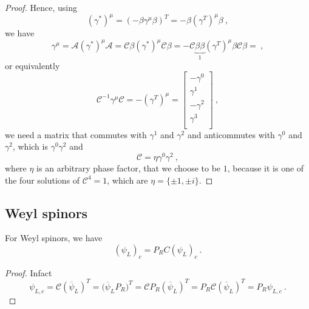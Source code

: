\begin{proof}
        Hence, using
        \begin{equation*}
            (\gamma^*)^\mu = (- \beta \gamma^\mu \beta)^T = - \beta (\gamma^T)^\mu \beta ~,
        \end{equation*}
        we have 
        \begin{equation*}
            \gamma^\mu = \mathcal A (\gamma^*)^\mu \mathcal A = \mathcal C \beta (\gamma^*)^\mu \mathcal C \beta = -\mathcal C \underbrace{\beta \beta }_ 1(\gamma^T)^\mu \beta \mathcal C \beta = ~,
        \end{equation*}
        or equivalently
        \begin{equation*}
            \mathcal C^{-1} \gamma^\mu \mathcal C = - (\gamma^T)^\mu = \begin{bmatrix}
                - \gamma^0 \\ \gamma^1 \\ - \gamma^2 \\ \gamma^3 \\
            \end{bmatrix} ~,
        \end{equation*}
        we need a matrix that commutes with $\gamma^1$ and $\gamma^2$ and anticommutes with $\gamma^0$ and $\gamma^2$, which is $\gamma^0 \gamma^2$ and 
        \begin{equation*}
            \mathcal C = \eta \gamma^0 \gamma^2~,
        \end{equation*}
        where $\eta$ is an arbitrary phase factor, that we choose to be $1$, because it is one of the four solutions of $\mathcal C^4 = 1$, which are $\eta = \{\pm 1, \pm i\}$.
    \end{proof}

\subsection{Weyl spinors}   

    For Weyl spinors, we have 
    \begin{equation*}
        (\psi_L)_c = P_R C (\psi_L)_c ~.
    \end{equation*}
    \begin{proof}
        Infact 
        \begin{equation*}
            \psi_{L,c} = \mathcal C (\overline \psi_L)^T = \mathcal (\overline \psi_L P_R)^T = \mathcal C P_R (\overline \psi_L)^T = P_R \mathcal C (\overline \psi_L)^T = P_R \psi_{L,c} ~.
        \end{equation*}
    \end{proof}


